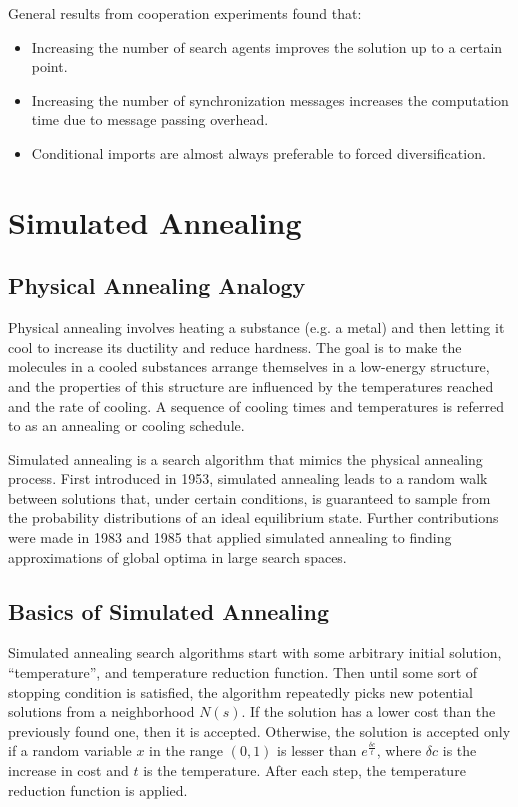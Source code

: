 \documentclass[12pt,titlepage]{article}
\begin{document}
      General results from cooperation experiments found that:
      \begin{itemize}
        \item Increasing the number of search agents improves the solution up to a certain point.
        \item Increasing the number of synchronization messages increases the computation time due to message passing overhead.
        \item Conditional imports are almost always preferable to forced diversification.
      \end{itemize}

  \section{Simulated Annealing}

    \subsection{Physical Annealing Analogy}
      Physical annealing involves heating a substance (e.g. a metal) and then letting it cool to increase its ductility and reduce hardness. The goal is to make the molecules
      in a cooled substances arrange themselves in a low-energy structure, and the properties of this structure are influenced by the temperatures reached and the rate of cooling.
      A sequence of cooling times and temperatures is referred to as an annealing or cooling schedule.

      Simulated annealing is a search algorithm that mimics the physical annealing process. First introduced in 1953, simulated annealing leads to a random walk between
      solutions that, under certain conditions, is guaranteed to sample from the probability distributions of an ideal equilibrium state. Further contributions were made in 1983
      and 1985 that applied simulated annealing to finding approximations of global optima in large search spaces.

    \subsection{Basics of Simulated Annealing}
      Simulated annealing search algorithms start with some arbitrary initial solution, ``temperature'', and temperature reduction function. Then until some sort of stopping condition
      is satisfied, the algorithm repeatedly picks new potential solutions from a neighborhood $N(s)$. If the solution has a lower cost than the previously found one, then it is accepted.
      Otherwise, the solution is accepted only if a random variable $x$ in the range $(0, 1)$ is lesser than $e^{\frac{\delta c}{t}}$, where $\delta c$ is the increase in cost and $t$ is
      the temperature. After each step, the temperature reduction function is applied.
\end{document}
